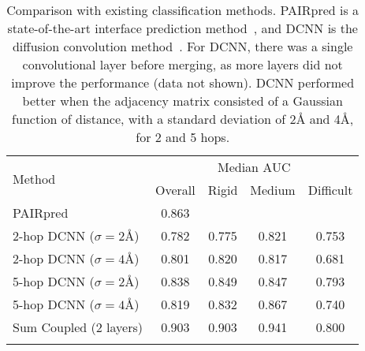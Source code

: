 \begin{table}
	\begin{center}
		\begin{tabular}{l c c c c }
			\toprule
			
			\multirow{2}{*}{Method} & \multicolumn{4}{c}{Median AUC} \\
			& Overall & Rigid & Medium & Difficult \\
			\midrule
			PAIRpred      & 0.863        & & & \\
			\midrule
			2-hop DCNN ($\sigma=2$\AA{}) & 0.782 & 0.775 & 0.821 & 0.753 \\
			2-hop DCNN ($\sigma=4$\AA{}) & 0.801 & 0.820 & 0.817 & 0.681 \\
			\midrule
			5-hop DCNN ($\sigma=2$\AA{}) & 0.838 & 0.849 & 0.847 & 0.793 \\ 
			5-hop DCNN ($\sigma=4$\AA{}) & 0.819 & 0.832 & 0.867 & 0.740 \\ 
			\midrule
			
			Sum Coupled (2 layers) & 0.903 & 0.903 & 0.941 & 0.800 \\ 
			\bottomrule
			\\
		\end{tabular}
		\caption{Comparison with existing classification methods. 
			PAIRpred is a state-of-the-art interface prediction method~\cite{minhas2014}, and DCNN is the diffusion convolution method~\cite{atwood2016}.
			For DCNN, there was a single convolutional layer before merging, as more layers did not improve the performance (data not shown). DCNN performed better when the adjacency matrix consisted of a Gaussian function of distance, with a standard deviation of 2\AA{} and 4\AA{}, for 2 and 5 hops.}
		\label{tab:results_compare}
	\end{center}
\end{table}

